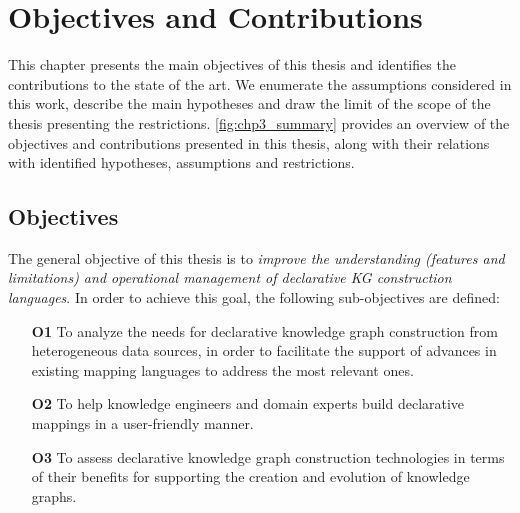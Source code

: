 \chapter{Objectives and Contributions}
\label{chapter:objectives}

This chapter presents the main objectives of this thesis and identifies the contributions to the state of the art. We enumerate the assumptions considered in this work, describe the main hypotheses and draw the limit of the scope of the thesis presenting the restrictions. \cref{fig:chp3_summary} provides an overview of the objectives and contributions presented in this thesis, along with their relations with identified hypotheses, assumptions and restrictions. 

\section{Objectives}
\label{sec:chp3-objectives}



The general objective of this thesis is to \textit{improve the understanding (features and limitations) and operational management of declarative KG construction languages}. In order to achieve this goal, the following sub-objectives are defined:

\begin{enumerate}
    \item[\textbf{O1}] To analyze the needs for declarative knowledge graph construction from heterogeneous data sources, in order to facilitate the support of advances in existing mapping languages to address the most relevant ones. 
    \item[\textbf{O2}] To help knowledge engineers and domain experts build declarative mappings in a user-friendly manner.
    \item[\textbf{O3}] To assess declarative knowledge graph construction technologies in terms of their benefits for supporting the creation and evolution of knowledge graphs. 
\end{enumerate}

